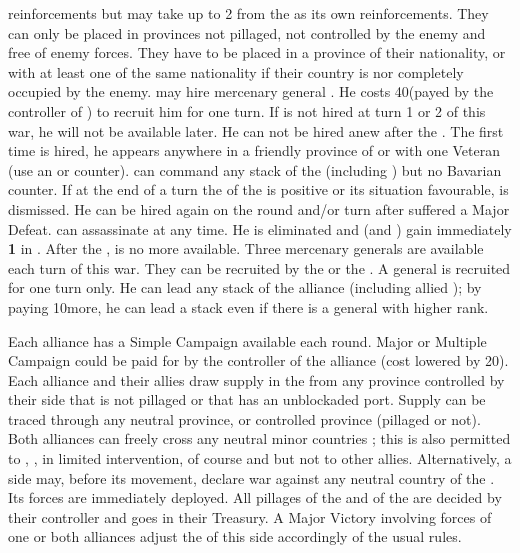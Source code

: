 \begin{digressions}
  reinforcements but may take up to 2 \LD from the \ligue as its own
  reinforcements.
  \bparag They can only be placed in provinces not pillaged, not controlled by
  the enemy and free of enemy forces.
  \bparag They have to be placed in a province of their nationality, or with
  at least one \LD of the same nationality if their country is nor completely
  occupied by the enemy.
  \aparag[Wallenstein] \HAB may hire mercenary general
  . He costs 40\ducats (payed by the controller of
  \ligue) to recruit him for one turn.
  \bparag If  is not hired at turn 1 or 2 of this war, he
  will not be available later. He can not be hired anew after the
  .  The first time  is
  hired, he appears anywhere in a friendly province of \payshabsbourg or
  \paysBoheme with one Veteran \ARMY\faceplus (use an \AUS or \HRE counter).
  \bparag {} can command any stack of the \ligue (including
  \HAB) but no Bavarian counter.
  \bparag If at the end of a turn the \STAB of the \ligue is positive or its
  situation favourable,  is dismissed.  He can be hired
  again on the round and/or turn after \ligue suffered a Major Defeat.
  \bparag \MAJHAB can assassinate  at any time.  He is
  eliminated and \ligue (and \AUT) gain immediately {\bf 1} in \STAB.
  \bparag After the ,  is no
  more available.
  \aparag Three mercenary generals are available each turn of this war.  They
  can be recruited by the \ligue or the \alliance. A general is recruited for
  one turn only. He can lead any stack of the alliance (including allied
  \MAJ); by paying 10\ducats more, he can lead a stack even if there is a
  general with higher rank.



  \phmil
  \aparag Each alliance has a Simple Campaign available each round.  Major or
  Multiple Campaign could be paid for by the controller of the alliance (cost
  lowered by 20\ducats).
  \aparag Each alliance and their allies draw supply in the \HRE from any
  province controlled by their side that is not pillaged or that has an
  unblockaded port.
  \aparag Supply can be traced through any neutral province, or controlled
  province (pillaged or not).
  \aparag Both alliances can freely cross any neutral \HRE minor countries ;
  this is also permitted to \DANdan, \SUE, \ENG in limited intervention, \HAB
  of course and \SPA but not to other allies.
  \aparag Alternatively, a side may, before its movement, declare war against
  any neutral country of the \HRE. Its forces are immediately deployed.
  \aparag All pillages of the \ligue and of the \alliance are decided by their
  controller and goes in their Treasury.
  \aparag A Major Victory involving forces of one or both alliances adjust the
  \STAB of this side accordingly of the usual rules.



\end{digressions}
